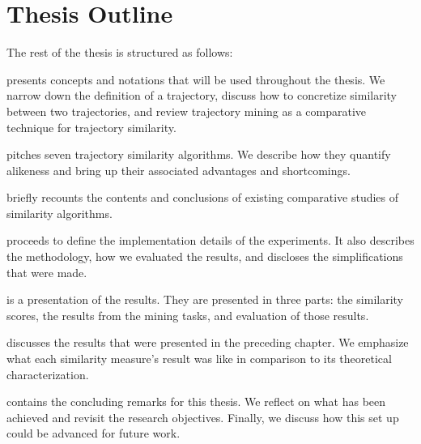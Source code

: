 
\section{Thesis Outline}

The rest of the thesis is structured as follows:


\textbf{} presents concepts and notations that will be used throughout the thesis. 
We narrow down the definition of a trajectory, discuss how to concretize similarity between two trajectories, and review trajectory mining as a comparative technique for trajectory similarity. 

\textbf{} pitches seven trajectory similarity algorithms. We describe how they quantify alikeness and bring up their associated advantages and shortcomings.

\textbf{} briefly recounts the contents and conclusions of existing comparative studies of similarity algorithms. 

\textbf{} proceeds to define the implementation details of the experiments. 
It also describes the methodology, how we evaluated the results, and discloses the simplifications that were made. 


\textbf{} is a presentation of the results. 
They are presented in three parts: the similarity scores, the results from the mining tasks, and evaluation of those results. 

\textbf{} discusses the results that were presented in the preceding chapter. 
We emphasize what each similarity measure's result was like in comparison to its theoretical characterization. %

\textbf{} contains the concluding remarks for this thesis. We reflect on what has been achieved and revisit the research objectives. 
Finally, we discuss how this set up could be advanced for future work. 











